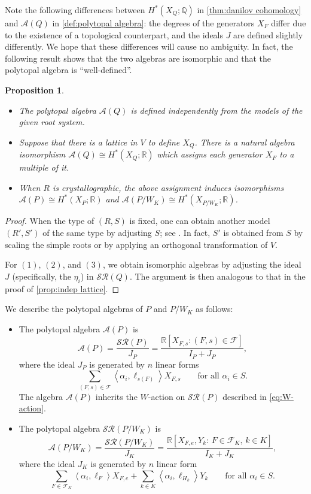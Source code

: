 \documentclass{amsart}
\theoremstyle{plain} \numberwithin{equation}{section}
\newtheorem{proposition}[theorem]{Proposition}
\theoremstyle{definition}
\newcommand{\R}{\mathbb{R}}
\newcommand{\Q}{\mathbb{Q}}
\newcommand{\ip}[1]{\left\langle #1 \right\rangle}
\begin{document}
Note the following differences between $H^*(X_Q;\Q)$ in \cref{thm:danilov cohomology} and $\mathcal{A}(Q)$ in \cref{def:polytopal algebra}: 
the degrees of the generators $X_F$ differ due to the existence of a topological counterpart, and the ideals $J$ are defined slightly differently.
 We hope that these differences  will cause no ambiguity. In fact, the following result shows that the two algebras are isomorphic and that the polytopal algebra is ``well-defined''.



\begin{proposition}\phantom{}
  \label{prop:independent model}
  \begin{itemize}
    \item[$(1)$] The polytopal algebra $\mathcal{A}(Q)$ is defined independently from the models of the given root system.
    \item[$(2)$] Suppose that there is a lattice in $V$ to define $X_Q$. There is a natural algebra isomorphism $\mathcal{A}(Q)\cong H^{*}(X_{Q};\R)$ which  assigns each generator $X_F$ to a multiple of it. 
    \item[$(3)$] When $R$ is crystallographic, the above assignment induces isomorphisms $\mathcal{A}(P)\cong H^{*}(X_{P};\R)$ and $\mathcal{A}(P/W_K)\cong H^{*}(X_{P/W_K};\R)$.
  \end{itemize}
\end{proposition}
\begin{proof}
  When the type of $(R,S)$ is fixed, one can obtain another model $(R',S')$ of the same type by adjusting $S$; see \cite[Remark 1.2, Proposition 2.1]{humphreysReflectionGroupsCoxeter1992}. In fact, $S'$ is obtained from $S$ by scaling the simple roots or by applying an orthogonal transformation of $V$.

For $(1)$, $(2)$, and $(3)$, we obtain isomorphic algebras by adjusting the ideal $J$ (specifically, the $\eta_i$) in $\mathcal{SR}(Q)$. The argument is then analogous to that in the proof of \cref{prop:indep lattice}.
\qedhere
\end{proof}


We describe the polytopal algebras of $P$ and $P/W_K$ as follows:
\begin{itemize}
    \item The polytopal algebra $\mathcal{A}(P)$ is 
  $$ \mathcal{A}(P)=\frac{\mathcal{SR}(P)}{J_P}=\frac{\R[X_{F,s}: (F,s)\in \mathcal{F}]}{I_P+J_P},
  $$
  where  the ideal $J_P$ is generated by $n$ linear forms
  $$\sum_{(F,s)\in\mathcal{F}}\ip{\alpha_i,\ell_{s(F)}}X_{F,s}\qquad \mbox{for all}\,\, \alpha_i\in S.$$ 
  The algebra $\mathcal{A}(P)$ inherits the $W$-action on $\mathcal{SR}(P)$ described in \cref{eq:W-action}.
  \item The polytopal algebra $\mathcal{SR}(P/W_K)$ is
  $$ \mathcal{A}(P/W_K)=\frac{\mathcal{SR}(P/W_K)}{J_K}=\frac{\R[X_{F,e}, Y_k:\, F\in\mathcal{F}_K,\, k\in K]}{I_K+J_K},
  $$
  where the ideal $J_K$ is generated by $n$ linear form
  $$\sum_{F\in\mathcal{F}_K}\ip{\alpha_i,\ell_{F}}X_{F,e}+\sum_{k\in K}\ip{\alpha_i,\ell_{H_k}}Y_k\qquad \mbox{for all}\,\, \alpha_i\in S.$$
  \end{itemize}
\end{document}
